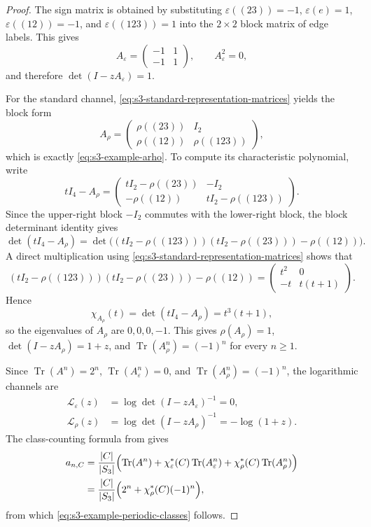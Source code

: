 \documentclass[11pt,a4paper]{amsart}
\theoremstyle{plain}
\theoremstyle{definition}
\theoremstyle{remark}
\DeclareMathOperator{\Tr}{Tr}
\begin{document}
\begin{proof}
  The sign matrix is obtained by substituting
  \(\varepsilon((23))=-1\), \(\varepsilon(e)=1\),
  \(\varepsilon((12))=-1\), and \(\varepsilon((123))=1\) into the
  \(2\times2\) block matrix of edge labels. This gives
  \[
    A_\varepsilon
    =
    \begin{pmatrix}
      -1 & 1 \\
      -1 & 1
    \end{pmatrix},
    \qquad
    A_\varepsilon^2=0,
  \]
  and therefore \(\det(I-zA_\varepsilon)=1\).

  For the standard channel, \eqref{eq:s3-standard-representation-matrices}
  yields the block form
  \[
    A_\rho
    =
    \begin{pmatrix}
      \rho((23)) & I_2 \\
      \rho((12)) & \rho((123))
    \end{pmatrix},
  \]
  which is exactly \eqref{eq:s3-example-arho}. To compute its
  characteristic polynomial, write
  \[
    tI_4-A_\rho
    =
    \begin{pmatrix}
      tI_2-\rho((23)) & -I_2 \\
      -\rho((12)) & tI_2-\rho((123))
    \end{pmatrix}.
  \]
  Since the upper-right block \(-I_2\) commutes with the lower-right
  block, the block determinant identity gives
  \[
    \det(tI_4-A_\rho)
    =
    \det\!\bigl((tI_2-\rho((123)))(tI_2-\rho((23)))-\rho((12))\bigr).
  \]
  A direct multiplication using
  \eqref{eq:s3-standard-representation-matrices} shows that
  \[
    (tI_2-\rho((123)))(tI_2-\rho((23)))-\rho((12))
    =
    \begin{pmatrix}
      t^2 & 0 \\
      -t & t(t+1)
    \end{pmatrix}.
  \]
  Hence
  \[
    \chi_{A_\rho}(t)=\det(tI_4-A_\rho)=t^3(t+1),
  \]
  so the eigenvalues of \(A_\rho\) are \(0,0,0,-1\). This gives
  \(\rho(A_\rho)=1\), \(\det(I-zA_\rho)=1+z\), and
  \(\Tr(A_\rho^n)=(-1)^n\) for every \(n\ge 1\).

  Since \(\Tr(A^n)=2^n\), \(\Tr(A_\varepsilon^n)=0\), and
  \(\Tr(A_\rho^n)=(-1)^n\), the logarithmic channels are
  \[
  \begin{aligned}
    \mathcal L_\varepsilon(z)
      &=\log\det(I-zA_\varepsilon)^{-1}=0,\\
    \mathcal L_\rho(z)
      &=\log\det(I-zA_\rho)^{-1}=-\log(1+z).
  \end{aligned}
  \]
  The class-counting formula from
   gives
  \[
    \begin{aligned}
      a_{n,C}
      &=
      \frac{|C|}{|S_3|}
        \Bigl(
          \Tr(A^n)
          +\chi_\varepsilon^\ast(C)\Tr(A_\varepsilon^n)
          +\chi_\rho^\ast(C)\Tr(A_\rho^n)
        \Bigr) \\
      &=
      \frac{|C|}{|S_3|}
        \Bigl(2^n+\chi_\rho^\ast(C)(-1)^n\Bigr),
    \end{aligned}
  \]
  from which \eqref{eq:s3-example-periodic-classes} follows.
\end{proof}
\end{document}
